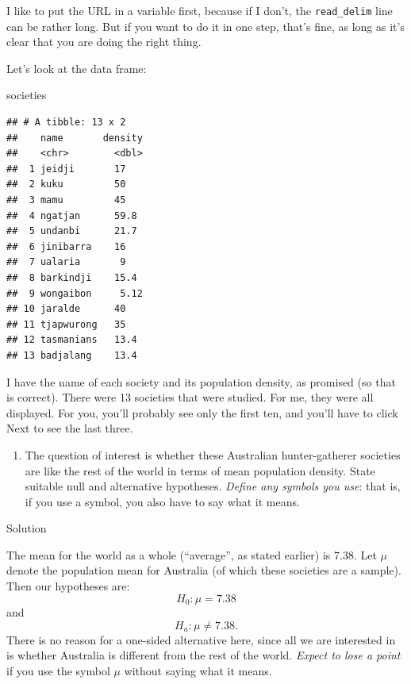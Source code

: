 \documentclass[]{tufte-book}
\newenvironment{Shaded}{}{}
\newcommand{\NormalTok}[1]{#1}
\providecommand{\tightlist}{%
  \setlength{\itemsep}{0pt}\setlength{\parskip}{0pt}}
\theoremstyle{definition}
\theoremstyle{definition}
\theoremstyle{definition}
\theoremstyle{remark}
\begin{document}
I like to put the URL in a variable first, because if I don't, the
\texttt{read\_delim} line can be rather long. But if you want to do it
in one step, that's fine, as long as it's clear that you are doing the
right thing.

Let's look at the data frame:

\begin{Shaded}
\begin{Highlighting}[]
\NormalTok{societies}
\end{Highlighting}
\end{Shaded}

\begin{verbatim}
## # A tibble: 13 x 2
##    name       density
##    <chr>        <dbl>
##  1 jeidji       17   
##  2 kuku         50   
##  3 mamu         45   
##  4 ngatjan      59.8 
##  5 undanbi      21.7 
##  6 jinibarra    16   
##  7 ualaria       9   
##  8 barkindji    15.4 
##  9 wongaibon     5.12
## 10 jaralde      40   
## 11 tjapwurong   35   
## 12 tasmanians   13.4 
## 13 badjalang    13.4
\end{verbatim}

I have the name of each society and its population density, as promised
(so that is correct). There were 13 societies that were studied. For me,
they were all displayed. For you, you'll probably see only the first
ten, and you'll have to click Next to see the last three.

\begin{enumerate}
\def\labelenumi{(\alph{enumi})}
\setcounter{enumi}{1}
\tightlist
\item
  The question of interest is whether these Australian hunter-gatherer
  societies are like the rest of the world in terms of mean population
  density. State suitable null and alternative hypotheses. \emph{Define
  any symbols you use}: that is, if you use a symbol, you also have to
  say what it means.
\end{enumerate}

Solution

The mean for the world as a whole (``average'', as stated earlier) is
7.38. Let \(\mu\) denote the population mean for Australia (of which
these societies are a sample). Then our hypotheses are:
\[ H_0: \mu=7.38\] and \[ H_a: \mu \ne 7.38.\] There is no reason for a
one-sided alternative here, since all we are interested in is whether
Australia is different from the rest of the world. \emph{Expect to lose
a point} if you use the symbol \(\mu\) without saying what it means.
\end{document}
